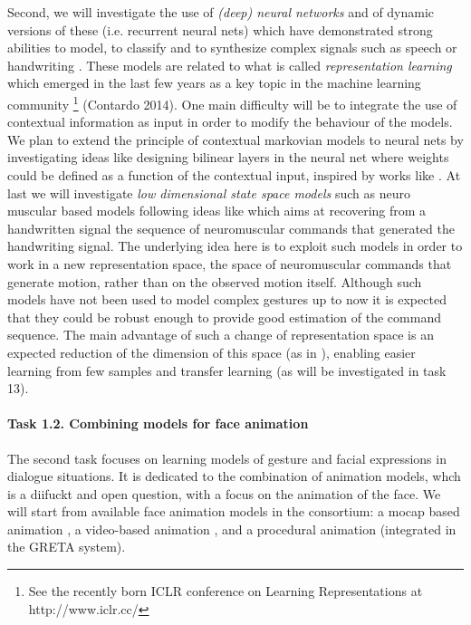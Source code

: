   Second, we will investigate the use of {\it (deep) neural networks} and of dynamic versions of these (i.e. recurrent neural nets) which have demonstrated strong abilities to model, to classify and to synthesize complex signals such as speech or handwriting \cite{HintonDeepSpeech, Deng_Speech_Reco, DBLP:conf/nips/GravesS08, DBLP:journals/corr/Graves13}. 
  These models are related to what is called {\it representation learning} which emerged in the last few years as a key topic in the machine learning community \footnote{See the recently born ICLR conference on Learning Representations at http://www.iclr.cc/} (Contardo 2014). 
  One main difficulty will be to integrate the use of contextual information as input in order to modify the behaviour of the models. We plan to extend the principle of contextual markovian models to neural nets by investigating ideas like designing bilinear layers in the neural net where weights could be defined as a function of the contextual input, inspired by works like \cite{DBLP:conf/mm/ZhongLL11, DBLP:journals/pami/HutchinsonDY13}.
  At last we will investigate {\it low dimensional state space models} such as neuro muscular based models following ideas like \cite{DBLP:conf/icfhr/FischerPOS1} which aims at recovering from a handwritten signal the sequence of neuromuscular commands that generated the handwriting signal. The underlying idea here is to exploit such models in order to work in a new representation space, the space of neuromuscular commands that generate motion, rather than on the observed motion itself. 
  Although such models have not been used to model complex gestures up to now it is expected that they could be robust enough to provide good estimation of the command sequence. The main advantage of such a change of representation space is an expected reduction of the dimension of this space (as in \cite{DBLP:journals/pami/WangFH08}), enabling easier learning from few samples and transfer learning (as will be investigated in task 13).
% 


\paragraph{Task 1.2. Combining models for face animation } 

The second task focuses on learning models of gesture and facial expressions in dialogue situations. It is dedicated to the combination of animation models, whch is a diifuckt and open question, with a focus on the animation of the face. We will start from available face animation models in the consortium: a mocap based animation \cite{Ding2013}, a video-based animation \cite{TheseINRIA}, and a procedural animation \cite{Greta} (integrated in the GRETA system). 


